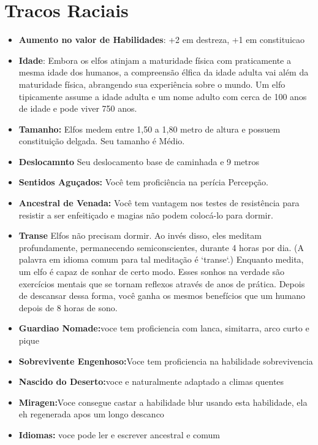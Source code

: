 \documentclass{book}
\begin{document}
\section{Tracos Raciais}
\begin{itemize}
    \item \textbf{Aumento no valor de Habilidades}: +2 em destreza, +1 em constituicao
    \item \textbf{Idade}: Embora os elfos atinjam a maturidade física com praticamente a mesma 
          idade dos humanos, a compreensão élfica da idade adulta vai além da maturidade 
          física, abrangendo sua experiência sobre o mundo. Um elfo tipicamente assume 
          a idade adulta e um nome adulto com cerca de 100 anos de idade e pode viver
          750 anos.
    \item \textbf{Tamanho:} Elfos medem entre 1,50 a 1,80 metro de altura e possuem 
          constituição delgada. Seu tamanho é Médio.
    \item \textbf{Deslocamnto} Seu deslocamento base de caminhada e 9 metros
       \item \textbf{Sentidos Aguçados:} Você tem proficiência na perícia Percepção.
    \item \textbf{Ancestral de Venada:} Você tem vantagem nos testes de resistência para 
          resistir  a ser enfeitiçado e magias não podem colocá-lo para dormir.
    \item \textbf{Transe} Elfos não precisam dormir. Ao invés disso, eles meditam 
          profundamente, permanecendo semiconscientes, durante 4 horas por 
          dia. (A palavra em idioma comum para tal meditação é `transe`.) Enquanto
          medita, um elfo é capaz de sonhar de certo modo. Esses sonhos na verdade 
          são exercícios mentais que se tornam reflexos através de anos de prática.
          Depois de descansar dessa forma, você ganha os mesmos benefícios que um
          humano depois de 8 horas de sono.
    \item \textbf{Guardiao Nomade:}voce tem proficiencia com lanca, simitarra, arco curto e  
        pique
    \item \textbf{Sobrevivente Engenhoso:}Voce tem proficiencia na habilidade sobrevivencia
    \item \textbf{Nascido do Deserto:}voce e naturalmente adaptado a climas quentes 
    \item \textbf{Miragen:}Voce consegue castar a habilidade blur usando esta habilidade, ela 
          eh regenerada apos um longo descanco 
     \item \textbf{Idiomas:} voce pode ler e escrever ancestral e comum 

\end{itemize}
\end{document}
